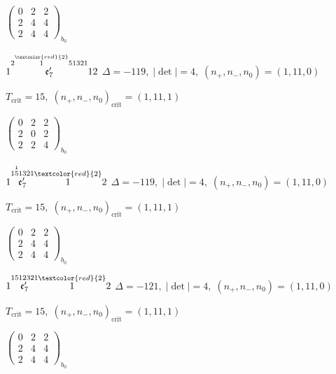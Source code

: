 \documentclass[10pt]{article}
\begin{document}
\hspace{2em}$\left(\begin{smallmatrix}0 & 2 & 2 \\ 2 & 4 & 4 \\ 2 & 4 & 4\end{smallmatrix}\right)_{\!b_0}$

$1\overset{2\overset{\textcolor{red}{2}}{1}51321}{\mathfrak{e}_7'}12$ \quad $\Delta=-119,\; |\det|=4,\; (n_+,n_-,n_0)=(1,11,0)$

\hspace{1em}$T_{\text{crit}}=15,\; (n_+,n_-,n_0)_{\text{crit}}=(1,11,1)$

\hspace{2em}$\left(\begin{smallmatrix}0 & 2 & 2 \\ 2 & 0 & 2 \\ 2 & 2 & 4\end{smallmatrix}\right)_{\!b_0}$

\smallskip

$1\overset{1\overset{1}{5}1321}{\mathfrak{e}_7'}\overset{\textcolor{red}{2}}{1}2$ \quad $\Delta=-119,\; |\det|=4,\; (n_+,n_-,n_0)=(1,11,0)$

\hspace{1em}$T_{\text{crit}}=15,\; (n_+,n_-,n_0)_{\text{crit}}=(1,11,1)$

\hspace{2em}$\left(\begin{smallmatrix}0 & 2 & 2 \\ 2 & 4 & 4 \\ 2 & 4 & 4\end{smallmatrix}\right)_{\!b_0}$

\smallskip

$1\overset{1512321}{\mathfrak{e}_7'}\overset{\textcolor{red}{2}}{1}2$ \quad $\Delta=-121,\; |\det|=4,\; (n_+,n_-,n_0)=(1,11,0)$

\hspace{1em}$T_{\text{crit}}=15,\; (n_+,n_-,n_0)_{\text{crit}}=(1,11,1)$

\hspace{2em}$\left(\begin{smallmatrix}0 & 2 & 2 \\ 2 & 4 & 4 \\ 2 & 4 & 4\end{smallmatrix}\right)_{\!b_0}$
\end{document}
